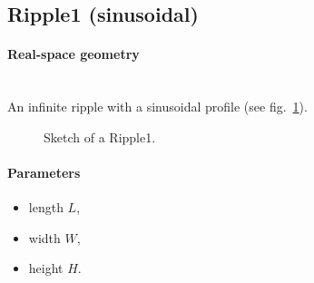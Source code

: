 \newpage
\subsection{Ripple1 (sinusoidal)}   

\paragraph{Real-space geometry}\strut\\
An infinite ripple with a sinusoidal profile (see fig.~\ref{fig:ripple1}).

\begin{figure}[ht]
\hfill
{}
\hfill
{}
\hfill
\caption{Sketch of a Ripple1.}
\label{fig:ripple1}
\end{figure}

\paragraph{Parameters}
\begin{itemize}
\item length $L$, 
\item width $W$, 
\item height $H$. 
\end{itemize}

